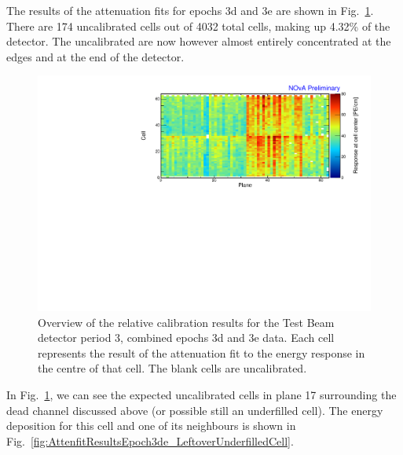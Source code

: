 The results of the attenuation fits for epochs 3d and 3e are shown in Fig.~\ref{fig:CellCentreResponseEp3de}. There are 174 uncalibrated cells out of 4032 total cells, making up 4.32\% of the detector. The uncalibrated are now however almost entirely concentrated at the edges and at the end of the detector.

\begin{figure}[!hbtp]
\centering
\includegraphics[width=\textwidth]{Plots/TBCalibration/CellResponseAtCentre_epoch3de_Limited_NOvAPlotStyle.pdf}
\caption[Map of fitted response at cell centre for epochs 3d and 3e data]{Overview of the relative calibration results for the Test Beam detector period 3, combined epochs 3d and 3e data. Each cell represents the result of the attenuation fit to the energy response in the centre of that cell. The blank cells are uncalibrated.}
\label{fig:CellCentreResponseEp3de}
\end{figure}

In Fig.~\ref{fig:CellCentreResponseEp3de}, we can see the expected uncalibrated cells in plane 17 surrounding the dead channel discussed above (or possible still an underfilled cell). The energy deposition for this cell and one of its neighbours is shown in Fig.~\ref{fig:AttenfitResultsEpoch3de_LeftoverUnderfilledCell}.

